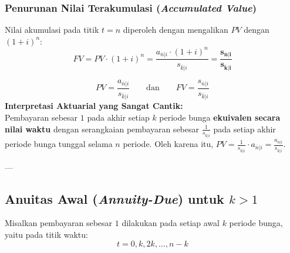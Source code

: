 \documentclass[11pt,a4paper]{article}
\begin{document}
\subsubsection{Penurunan Nilai Terakumulasi (\textit{Accumulated Value})}
Nilai akumulasi pada titik $t = n$ diperoleh dengan mengalikan $PV$ dengan $(1+i)^n$:
\begin{equation}
    FV = PV \cdot (1+i)^n = \frac{a_{\overline{n}|i} \cdot (1+i)^n}{s_{\overline{k}|i}} = \mathbf{\frac{s_{\overline{n}|i}}{s_{\overline{k}|i}}}
\end{equation}

\begin{definitionbox}
\begin{equation}
    PV = \frac{a_{\overline{n}|i}}{s_{\overline{k}|i}} \qquad \text{dan} \qquad FV = \frac{s_{\overline{n}|i}}{s_{\overline{k}|i}}
\end{equation}
\textbf{Interpretasi Aktuarial yang Sangat Cantik:}\\
Pembayaran sebesar $1$ pada akhir setiap $k$ periode bunga \textbf{ekuivalen secara nilai waktu} dengan serangkaian pembayaran sebesar $\frac{1}{s_{\overline{k}|i}}$ pada setiap akhir periode bunga tunggal selama $n$ periode. Oleh karena itu, $PV = \frac{1}{s_{\overline{k}|i}} \cdot a_{\overline{n}|i} = \frac{a_{\overline{n}|i}}{s_{\overline{k}|i}}$.
\end{definitionbox}

---

\subsection{Anuitas Awal (\textit{Annuity-Due}) untuk \texorpdfstring{$k > 1$}{k > 1}}

Misalkan pembayaran sebesar $1$ dilakukan pada setiap awal $k$ periode bunga, yaitu pada titik waktu:
\begin{equation*}
    t = 0, k, 2k, \dots, n-k
\end{equation*}
\end{document}
